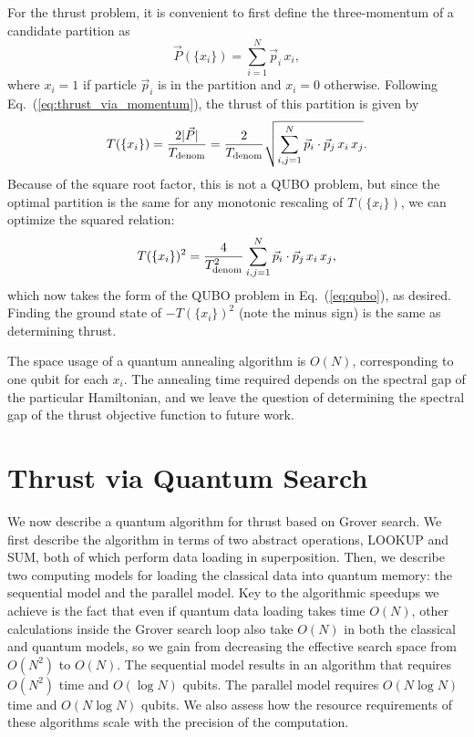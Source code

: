 \documentclass[aps,prd,twocolumn,superscriptaddress,preprintnumbers,nofootinbib,longbibliography,floatfix]{revtex4-1}
\DeclareRobustCommand{\Eq}[1]{Eq.~(\ref{#1})}
\begin{document}
For the thrust problem, it is convenient to first define the three-momentum of a candidate partition as
%
\begin{equation}
\vec{P}(\{x_i\}) = \sum_{i = 1}^N \vec{p}_i \, x_i,
\end{equation}
%
where $x_i=1$ if particle $\vec{p}_i$ is in the partition and $x_i = 0$ otherwise.
%
Following \Eq{eq:thrust_via_momentum}, the thrust of this partition is given by
%
\begin{equation}
T(\{x_i\}) = \frac{2 |\vec{P}|}{T_{\rm denom}} = \frac{2}{T_{\rm denom}} \sqrt{\sum_{i,j = 1}^N \vec{p}_i \cdot \vec{p}_j \, x_i  \, x_j}.
\end{equation}
%
Because of the square root factor, this is not a QUBO problem, but since the optimal partition is the same for any monotonic rescaling of $T(\{x_i\})$, we can optimize the squared relation:
%
\begin{equation}
T(\{x_i\})^2 = \frac{4}{T^2_{\rm denom}} \sum_{i,j = 1}^N \vec{p}_i \cdot \vec{p}_j \, x_i  \, x_j,
\end{equation}
%
which now takes the form of the \ac{QUBO} problem in \Eq{eq:qubo}, as desired.
%
Finding the ground state of $- T(\{x_i\})^2$ (note the minus sign) is the same as determining thrust.


The space usage of a quantum annealing algorithm is $O(N)$, corresponding to one qubit for each $x_i$.
%
The annealing time required depends on the spectral gap of the particular Hamiltonian, and we leave the question of determining the spectral gap of the thrust objective function to future work.

%
%

\section{Thrust via Quantum Search}
\label{sec:grover}


We now describe a quantum algorithm for thrust based on Grover search.
%
We first describe the algorithm in terms of two abstract operations, LOOKUP and SUM, both of which perform data loading in superposition.
%
Then, we describe two computing models for loading the classical data into quantum memory: the sequential model and the parallel model.
%
Key to the algorithmic speedups we achieve is the fact that even if quantum data loading takes time $O(N)$, other calculations inside the Grover search loop also take $O(N)$ in both the
classical and quantum models, so we gain from decreasing the effective search space from $O(N^2)$ to $O(N)$.
%
The sequential model results in an algorithm that requires $O(N^2)$ time and $O(\log N)$ qubits.
%
The parallel model requires $O(N \log N)$ time and $O(N\log N)$ qubits.
%
We also assess how the resource requirements of these algorithms scale with the precision of the computation.
\end{document}
